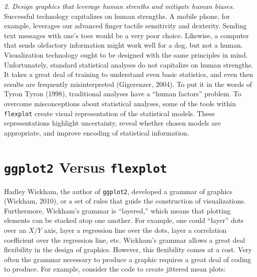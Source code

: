 \documentclass[
  man]{apa6}
\begin{document}
\emph{2. Design graphics that leverage human strenths and mitigate human biases.} Successful technology capitalizes on human strengths. A mobile phone, for example, leverages our advanced finger tactile sensitivity and dexterity. Sending text messages with one's toes would be a very poor choice. Likewise, a computer that sends olefactory information might work well for a dog, but not a human. Visualization technology ought to be designed with the same principles in mind. Unfortunately, standard statistical analyses do not capitalize on human strengths. It takes a great deal of training to understand even basic statistics, and even then results are frequently misinterpreted (Gigerenzer, 2004). To put it in the words of Tyron Tyron (1998), traditional analyses have a \enquote{human factors} problem. To overcome misconceptions about statistical analyses, some of the tools within \texttt{flexplot} create visual representation of the statistical models. These representations highlight uncertainty, reveal whether chosen models are appropriate, and improve encoding of statistical information.

\hypertarget{ggplot2-versus-flexplot}{%
\section{\texorpdfstring{\texttt{ggplot2} Versus \texttt{flexplot}}{ggplot2 Versus flexplot}}\label{ggplot2-versus-flexplot}}

Hadley Wickham, the author of \texttt{ggplot2}, developed a grammar of graphics (Wickham, 2010), or a set of rules that guide the construction of visualizations. Furthermore, Wickham's grammar is \enquote{layered,} which means that plotting elements can be stacked atop one another. For example, one could \enquote{layer} dots over an \(X/Y\) axis, layer a regression line over the dots, layer a correlation coefficient over the regression line, etc. Wickham's grammar allows a great deal flexibility in the design of graphics. However, this flexibility comes at a cost. Very often the grammar necessary to produce a graphic requires a great deal of coding to produce. For example, consider the code to create jittered mean plots:
\end{document}
